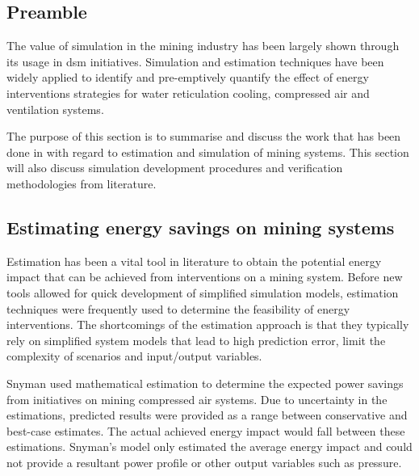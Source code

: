 	\subsection{Preamble}
	The value of simulation in the mining industry has been largely shown through its usage in \gls{dsm} initiatives. Simulation and estimation techniques have been widely applied to identify and pre-emptively quantify the effect of energy interventions strategies for water reticulation cooling, compressed air and ventilation systems.
	\par
	 The purpose of this section is to summarise and discuss the work that has been done in with regard to estimation and simulation of mining systems. This section will also discuss simulation development procedures and verification methodologies from literature.
	
	\subsection{Estimating energy savings on mining systems }
	Estimation has been a vital tool in literature to obtain the potential energy impact that can be achieved from interventions on a mining system. Before new tools allowed for quick development of simplified simulation models, estimation techniques were frequently used to determine the feasibility of energy interventions. The shortcomings of the estimation approach is that they typically rely on simplified system models that lead to high prediction error, limit the complexity of scenarios and input/output variables.
		\par 
	Snyman \cite{Snyman2011Masters} used mathematical estimation to determine the expected power savings from initiatives on mining compressed air systems.  Due to uncertainty in the estimations, \cite{Snyman2011Masters} predicted results were provided as a range between conservative and best-case estimates. The actual achieved energy impact would fall between these estimations. Snyman's model only estimated the average energy impact and could not provide a resultant power profile or other output variables such as pressure.
		 	
